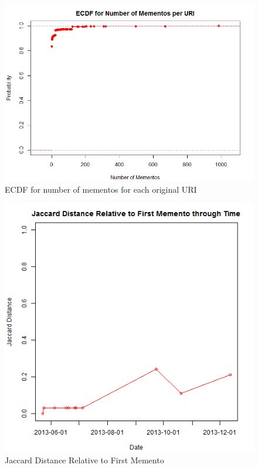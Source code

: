 \documentclass[12pt]{Report}
\begin{document}
\begin{figure}[ht]    
    \begin{center}
        \includegraphics[scale=0.60]{NumberOfMementoS.png}
        \caption{ECDF for number of mementos for each original URI }
        \label{ECDF for number of mementos for each original URI }
    \end{center}
\end{figure}
\newpage

 
 \begin{figure}[ht]    
    \begin{center}
        \includegraphics[scale=0.60]{link1.png}
        \caption{Jaccard Distance Relative to First Memento }
        \label{Jaccard Distance Relative to First Memento}
    \end{center}
\end{figure}
\newpage
 
\end{document}
